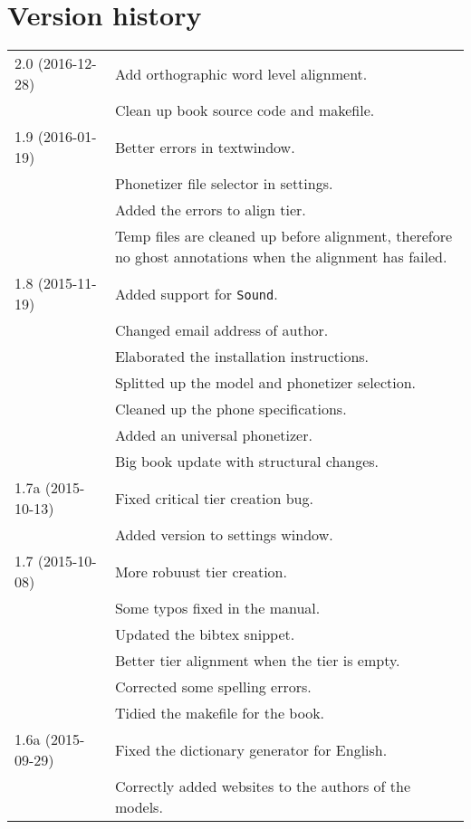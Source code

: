 \section{Version history}
\begin{longtable}{|p{0.22\linewidth}p{0.8\linewidth}|}
	\toprule
	2.0 (2016{-}12{-}28) & \tabitem{} Add orthographic word level alignment.\\
		& \tabitem{} Clean up book source code and makefile.\\
	\midrule
	1.9 (2016{-}01{-}19) & \tabitem{} Better errors in textwindow.\\
		& \tabitem{} Phonetizer file selector in settings.\\
		& \tabitem{} Added the errors to align tier.\\
		& \tabitem{} Temp files are cleaned up before alignment, therefore no
			ghost annotations when the alignment has failed.\\
	\midrule
	1.8 (2015{-}11{-}19) & \tabitem{} Added support for \texttt{Sound}.\\
		& \tabitem{} Changed email address of author.\\
		& \tabitem{} Elaborated the installation instructions.\\
		& \tabitem{} Splitted up the model and phonetizer selection.\\
		& \tabitem{} Cleaned up the phone specifications.\\
		& \tabitem{} Added an universal phonetizer.\\
		& \tabitem{} Big book update with structural changes.\\
	\midrule
	1.7a (2015{-}10{-}13) & \tabitem{} Fixed critical tier creation bug.\\
	& \tabitem{} Added version to settings window.\\
	\midrule
	1.7 (2015{-}10{-}08) & \tabitem{} More robuust tier creation.\\
		& \tabitem{} Some typos fixed in the manual.\\
		& \tabitem{} Updated the bibtex snippet.\\
		&	\tabitem{} Better tier alignment when the tier is empty.\\
		&	\tabitem{} Corrected some spelling errors.\\
		&	\tabitem{} Tidied the makefile for the book.\\
	\midrule
	1.6a (2015{-}09{-}29) & \tabitem{} Fixed the dictionary generator for English.\\
		& \tabitem{} Correctly added websites to the authors of the models.\\

\end{longtable}
